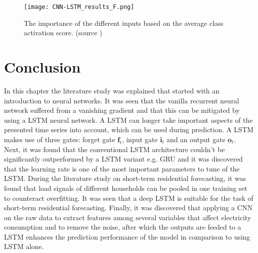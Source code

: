 \begin{figure}[h!]
	\centering
	\texttt{[image: CNN-LSTM\_results\_F.png]}
	\caption{The importance of the different inputs based on the average class activation score. (source \cite{Kim2019})}
	\label{fig:LSTM_lit_results}
\end{figure}


\section{Conclusion}
In this chapter the literature study was explained that started with an introduction to neural networks. It was seen that the vanilla recurrent neural network suffered from a vanishing gradient and that this can be mitigated by using a LSTM neural network. A LSTM can longer take important aspects of the presented time series into account, which can be used during prediction. A LSTM makes use of three gates: forget gate $ \textbf{f}_t $, input gate $ \textbf{i}_t $ and an output gate $ \textbf{o}_t $. Next, it was found that the conventional LSTM architecture couldn't be significantly outperformed by a LSTM variant e.g. GRU and it was discovered that the learning rate is one of the most important parameters to tune of the LSTM. During the literature study on short-term residential forecasting, it was found that load signals of different households can be pooled in one training set to counteract overfitting. It was seen that a deep LSTM is suitable for the task of short-term residential forecasting. Finally, it was discovered that applying a CNN on the raw data to extract features among several variables that affect electricity consumption and to remove the noise, after which the outputs are feeded to a LSTM enhances the prediction performance of the model in comparison to using LSTM alone.




